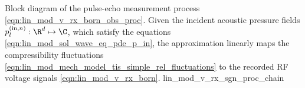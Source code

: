 %
{%
 Block diagram of
 the pulse-echo measurement process
 \eqref{eqn:lin_mod_v_rx_born_obs_proc}.
 Given
 the incident acoustic pressure fields
 $p_{l}^{(\text{in}, n)}: \R^{d} \mapsto \C$, which satisfy
 the  equations
 \eqref{eqn:lin_mod_sol_wave_eq_pde_p_in},
 the  approximation linearly maps
 the compressibility fluctuations
 \eqref{eqn:lin_mod_mech_model_tis_simple_rel_fluctuations} to
 the recorded \ac{RF} voltage signals
 \eqref{eqn:lin_mod_v_rx_born}.
}%
{lin_mod_v_rx_sgn_proc_chain}

